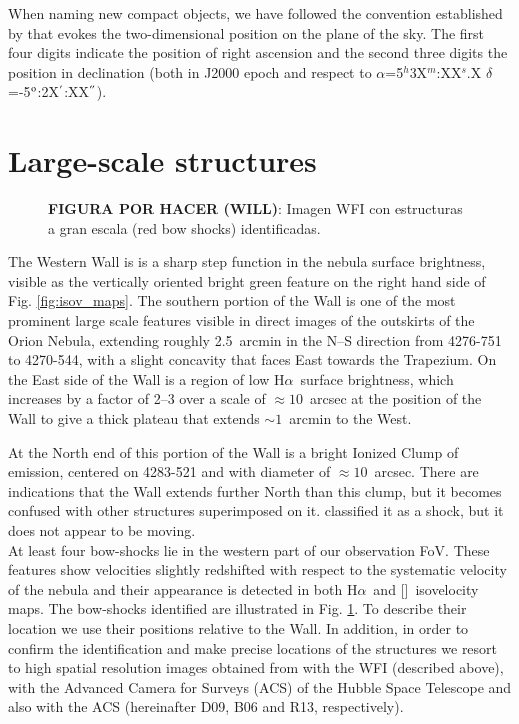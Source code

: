\documentclass[a4paper,fleqn,usenatbib]{mnras}     %
\newcommand{\Ha} {H$\alpha$}      		%
\newcommand{\NII} {[\ion{N}{ii}]}            %
\begin{document}
When naming new compact objects, we have followed the convention established by \citet{ODell1994} that evokes the two-dimensional 
position on the plane of the sky. The first four digits indicate the position of right ascension 
and the second three digits the position in declination (both in J2000 epoch and respect to 
$\alpha$=5${^h}$3X${^m}$:XX${^s}$.X $\delta$=-5$^{\rm o}$:2X$^{\rm '}$:XX$^{\rm ''}$).




\section{Large-scale structures}\label{sec:red_large_structures}

\begin{figure}
    \caption{\textbf{FIGURA POR HACER (WILL)}: Imagen WFI con estructuras a gran escala (red bow shocks) identificadas.}
    \label{fig:red_features}
\end{figure}

The Western Wall is is a sharp step function in the nebula surface brightness, visible as the vertically oriented bright green
feature on the right hand side of Fig. \ref{fig:isov_maps}. The southern portion of the Wall is one of the most prominent 
large scale features visible in direct images of the outskirts of the Orion Nebula, extending roughly 2.5~arcmin in the N--S 
direction from 4276-751 to 4270-544, with a slight concavity that faces East towards the Trapezium. On the East side of the 
Wall is a region of low \Ha~surface brightness, which increases by a factor of 2--3 over a scale of \(\approx 10\)~arcsec at the 
position of the Wall to give a thick plateau that extends \(\sim 1\)~arcmin to the West.

At the North end of this portion of the Wall is a bright Ionized Clump of emission, centered on 4283-521 and with diameter 
of \(\approx10\)~arcsec.  There are indications that the Wall extends further North than this clump, but it becomes confused 
with other structures superimposed on it. \citet{ODell2015} classified it as a shock, but it does not appear to be moving.\\

At least four bow-shocks lie in the western part of our observation FoV. These features show velocities slightly redshifted with respect to 
the systematic velocity of the nebula and their appearance is detected in both \Ha~and \NII~isovelocity maps. The bow-shocks identified are 
illustrated in Fig. \ref{fig:red_features}. To describe their location we use their positions relative to the Wall. In addition, in order to 
confirm the identification and make precise locations of the structures we resort to high spatial resolution images obtained from \citet{DaRio2009} 
with the WFI (described above), \citet{Bally2006} with the Advanced Camera for Surveys (ACS) of the Hubble Space Telescope and \citet{Robberto2013} 
also with the ACS (hereinafter D09, B06 and R13, respectively). 
\end{document}
